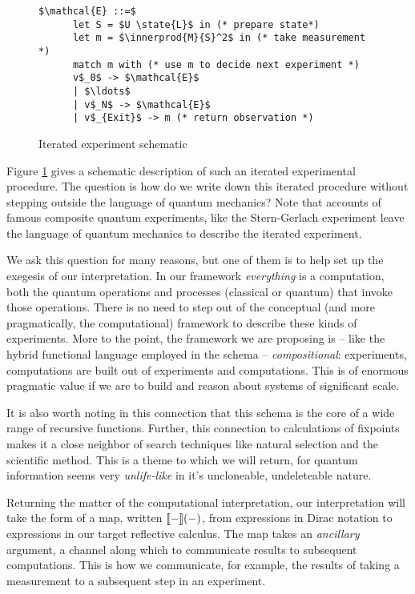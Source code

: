 \begin{figure}[htp]\label{fig:iterated_experiment}
    \begin{lstlisting}[mathescape]
      $\mathcal{E} ::=$
      let S = $U \state{L}$ in (* prepare state*)
      let m = $\innerprod{M}{S}^2$ in (* take measurement *)
      match m with (* use m to decide next experiment *)
      v$_0$ -> $\mathcal{E}$
      | $\ldots$
      | v$_N$ -> $\mathcal{E}$
      | v$_{Exit}$ -> m (* return observation *)
    \end{lstlisting}
  \caption{Iterated experiment schematic}
\end{figure}

Figure \ref{fig:iterated_experiment} gives a schematic description of
such an iterated experimental procedure. The question is how do we
write down this iterated procedure without stepping outside the
language of quantum mechanics? Note that accounts of famous composite
quantum experiments, like the Stern-Gerlach experiment leave the
language of quantum mechanics to describe the iterated experiment.

We ask this question for many reasons, but one of them is to help set
up the exegesis of our interpretation. In our framework
\emph{everything} is a computation, both the quantum operations and
processes (classical or quantum) that invoke those operations. There
is no need to step out of the conceptual (and more pragmatically, the
computational) framework to describe these kinds of experiments. More
to the point, the framework we are proposing is -- like the hybrid
functional language employed in the schema -- \emph{compositional}:
experiments, computations are built out of experiments and
computations. This is of enormous pragmatic value if we are to build
and reason about systems of significant scale.

\begin{remark}
  It is also worth noting in this connection that this schema is the
  core of a wide range of recursive functions. Further, this
  connection to calculations of fixpoints makes it a close neighbor of
  search techniques like natural selection and the scientific
  method. This is a theme to which we will return, for quantum
  information seems very \emph{unlife-like} in it's uncloneable,
  undeleteable nature.
\end{remark}

Returning the matter of the computational interpretation, our
interpretation will take the form of a map, written
$[\![ - ]\!](-)$, from expressions in Dirac notation to expressions
in our target reflective calculus. The map takes an \emph{ancillary}
argument, a channel along which to communicate results to subsequent
computations. This is how we communicate, for example, the results of
taking a measurement to a subsequent step in an experiment.

